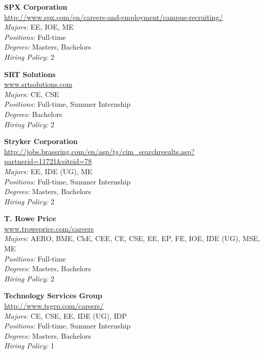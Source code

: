 \documentclass{article}
\begin{document}
\begin{center}
\begin{multicols}{3}
\begin{minipage}{.9\columnwidth}{\Large\bf SPX Corporation }\\
	\url{http://www.spx.com/en/careers-and-employment/campus-recruiting/}\\
	\emph{Majors:} EE, IOE, ME\\
	\emph{Positions:} Full-time\\
	\emph{Degrees:} Masters, Bachelors\\
	\emph{Hiring Policy:} 2\\
\end{minipage}
 
\begin{minipage}{.9\columnwidth}{\Large\bf SRT Solutions }\\
	\url{www.srtsolutions.com}\\
	\emph{Majors:} CE, CSE\\
	\emph{Positions:} Full-time, Summer Internship\\
	\emph{Degrees:} Bachelors\\
	\emph{Hiring Policy:} 2\\
\end{minipage}
 
\begin{minipage}{.9\columnwidth}{\Large\bf Stryker Corporation }\\
	\url{http://jobs.brassring.com/en/asp/tg/cim_searchresults.asp?partnerid=11721&siteid=78}\\
	\emph{Majors:} EE, IDE (UG), ME\\
	\emph{Positions:} Full-time, Summer Internship\\
	\emph{Degrees:} Masters, Bachelors\\
	\emph{Hiring Policy:} 2\\
\end{minipage}
 
\begin{minipage}{.9\columnwidth}{\Large\bf T. Rowe Price }\\
	\url{www.troweprice.com/careers}\\
	\emph{Majors:} AERO, BME, ChE, CEE, CE, CSE, EE, EP, FE, IOE, IDE (UG), MSE, ME\\
	\emph{Positions:} Full-time\\
	\emph{Degrees:} Masters, Bachelors\\
	\emph{Hiring Policy:} 2\\
\end{minipage}
 
\begin{minipage}{.9\columnwidth}{\Large\bf Technology Services Group }\\
	\url{http://www.tsgrp.com/careers/}\\
	\emph{Majors:} CE, CSE, EE, IDE (UG), IDP\\
	\emph{Positions:} Full-time, Summer Internship\\
	\emph{Degrees:} Masters, Bachelors\\
	\emph{Hiring Policy:} 1\\
\end{minipage}
 

\end{multicols}
\end{center}
\end{document}
